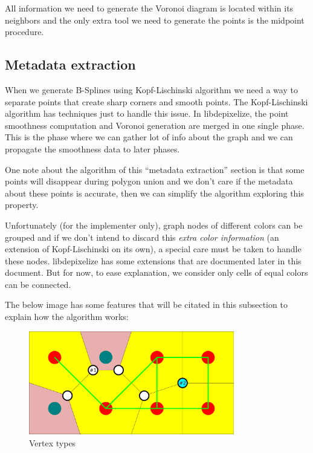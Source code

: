 All information we need to generate the Voronoi diagram is located within its
neighbors and the only extra tool we need to generate the points is the midpoint
procedure.

\subsection{Metadata extraction}

When we generate B-Splines using Kopf-Lischinski algorithm we need a way to
separate points that create sharp corners and smooth points. The Kopf-Lischinski
algorithm has techniques just to handle this issue. In libdepixelize, the point
smoothness computation and Voronoi generation are merged in one single phase.
This is the phase where we can gather lot of info about the graph and we can
propagate the smoothness data to later phases.

One note about the algorithm of this ``metadata extraction'' section is that
some points will disappear during polygon union and we don't care if the
metadata about these points is accurate, then we can simplify the algorithm
exploring this property.

Unfortunately (for the implementer only), graph nodes of different colors can be
grouped and if we don't intend to discard this \emph{extra color information}
(an extension of Kopf-Lischinski on its own), a special care must be taken to
handle these nodes. libdepixelize has some extensions that are documented later
in this document. But for now, to ease explanation, we consider only cells of
equal colors can be connected.

The below image has some features that will be citated in this subsection to
explain how the algorithm works:

\begin{figure}[H]
  \centering
  \includegraphics[width=0.8\textwidth]{assets/voronoi3.pdf}
  \caption{Vertex types}
\end{figure}

